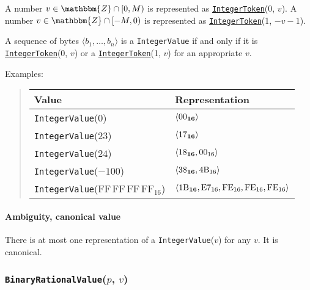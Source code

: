 \documentclass[headings=normal, headsepline, numbers=noenddot, fleqn, a4paper]{scrartcl}
\newcommand{\HexNumber}[1]{\mathrm{#1}_{16}}
\newcommand{\DborSyntaxIdent}[1]{\texttt{#1}}
\newcommand{\DborSyntaxIdentRef}[1]{\hyperlink{sec:def:#1}{\DborSyntaxIdent{#1}}}
\newcommand{\DborFirstByte}[2]{\mathbf{\textcolor{#1}{\HexNumber{#2}}}}
\newcommand{\DborFirstByteNumber}[1]{\DborFirstByte{black}{#1}}
\newcommand{\DborNextByte}[1]{\HexNumber{#1}}
\begin{document}
    A number $v \in \mathbbm{Z} \cap [0, M)$ is represented as \DborSyntaxIdentRef{IntegerToken}(0, $v$).
    A number $v \in \mathbbm{Z} \cap [-M, 0)$ is represented as \DborSyntaxIdentRef{IntegerToken}(1, $-v - 1$).

    A sequence of bytes $\langle b_1, \ldots, b_n\rangle$ is a \DborSyntaxIdent{IntegerValue} if and only if
    it is \DborSyntaxIdentRef{IntegerToken}(0, $v$) or a \DborSyntaxIdentRef{IntegerToken}(1, $v$) for an
    appropriate $v$.

    \smallskip
    \noindent
    Examples:
    \nolinebreak
    \begin{quote}    
        \begin{tabular}{ll}
            \toprule
            Value & Representation \\
            \midrule
            \DborSyntaxIdent{IntegerValue}($0$)    
                &  $\langle \DborFirstByteNumber{00} \rangle$ \\
            \DborSyntaxIdent{IntegerValue}($23$)
                &  $\langle \DborFirstByteNumber{17} \rangle$ \\
            \DborSyntaxIdent{IntegerValue}($24$)
                &  $\langle \DborFirstByteNumber{18}, \DborNextByte{00} \rangle$ \\
            \DborSyntaxIdent{IntegerValue}($-100$) 
                &  $\langle \DborFirstByteNumber{38}, \DborNextByte{4B} \rangle$ \\
            \DborSyntaxIdent{IntegerValue}($\HexNumber{FF\,FF\,FF\,FF}$) 
                &  $\langle \DborFirstByteNumber{1B}, \DborNextByte{E7}, \DborNextByte{FE},
                   \DborNextByte{FE}, \DborNextByte{FE} \rangle$ \\
            \bottomrule
        \end{tabular}
    \end{quote}

    \paragraph{Ambiguity, canonical value}

    There is at most one representation of a \DborSyntaxIdent{IntegerValue}($v$) for any $v$.
    It is canonical.


    \subsubsection{\DborSyntaxIdent{BinaryRationalValue}($p$, $v$)}
    \hypertarget{sec:def:BinaryRationalValue}{}
\end{document}
